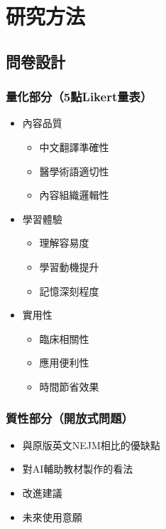 \documentclass[12pt]{article}
\begin{document}
\section{研究方法}
\subsection{問卷設計}
\subsubsection{量化部分（5點Likert量表）}
\begin{itemize}
    \item 內容品質
    \begin{itemize}
        \item 中文翻譯準確性
        \item 醫學術語適切性
        \item 內容組織邏輯性
    \end{itemize}
    \item 學習體驗
    \begin{itemize}
        \item 理解容易度
        \item 學習動機提升
        \item 記憶深刻程度
    \end{itemize}
    \item 實用性
    \begin{itemize}
        \item 臨床相關性
        \item 應用便利性
        \item 時間節省效果
    \end{itemize}
\end{itemize}

\subsubsection{質性部分（開放式問題）}
\begin{itemize}
    \item 與原版英文NEJM相比的優缺點
    \item 對AI輔助教材製作的看法
    \item 改進建議
    \item 未來使用意願
\end{itemize}
\end{document}

